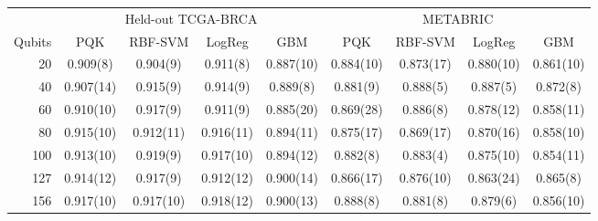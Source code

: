 \begin{tabular}{rcccccccc}
\toprule
 & \multicolumn{4}{c}{Held-out TCGA-BRCA} & \multicolumn{4}{c}{METABRIC} \\
\cmidrule(lr){2-5}\cmidrule(lr){6-9}
Qubits & PQK & RBF-SVM & LogReg & GBM & PQK & RBF-SVM & LogReg & GBM \\
\midrule
20 & 0.909(8) & 0.904(9) & 0.911(8) & 0.887(10) & 0.884(10) & 0.873(17) & 0.880(10) & 0.861(10) \\
40 & 0.907(14) & 0.915(9) & 0.914(9) & 0.889(8) & 0.881(9) & 0.888(5) & 0.887(5) & 0.872(8) \\
60 & 0.910(10) & 0.917(9) & 0.911(9) & 0.885(20) & 0.869(28) & 0.886(8) & 0.878(12) & 0.858(11) \\
80 & 0.915(10) & 0.912(11) & 0.916(11) & 0.894(11) & 0.875(17) & 0.869(17) & 0.870(16) & 0.858(10) \\
100 & 0.913(10) & 0.919(9) & 0.917(10) & 0.894(12) & 0.882(8) & 0.883(4) & 0.875(10) & 0.854(11) \\
127 & 0.914(12) & 0.917(9) & 0.912(12) & 0.900(14) & 0.866(17) & 0.876(10) & 0.863(24) & 0.865(8) \\
156 & 0.917(10) & 0.917(10) & 0.918(12) & 0.900(13) & 0.888(8) & 0.881(8) & 0.879(6) & 0.856(10) \\
\bottomrule
\end{tabular}
